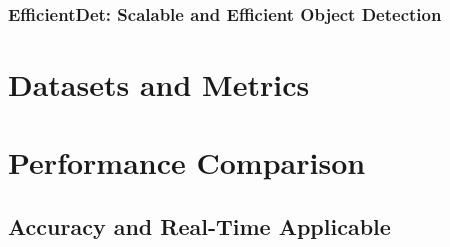 \documentclass[12pt, oneside]{article}
\begin{document}
\subsubsection{EfficientDet: Scalable and Efficient Object Detection}

\vfill

\section{Datasets and Metrics}

\vfill

\section{Performance Comparison}

\vfill

\subsection{Accuracy and Real-Time Applicable}


\newpage

\printbibliography
\end{document}
